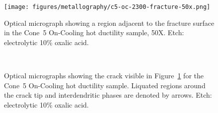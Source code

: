 {%


\begin{figure}
    \centering
    \texttt{[image: figures/metallography/c5-oc-2300-fracture-50x.png]}
    \caption{Optical micrograph showing a region adjacent to the fracture surface in the Cone~5 On-Cooling \protect{} hot ductility sample, 50X. Etch: electrolytic 10\% oxalic acid.}
    \label{fig:c5-oc-2300-fracture-50x}
\end{figure}

\begin{figure}
    \centering
     \\
    \caption[Optical micrographs showing the crack visible in Figure~\ref{fig:c5-oc-2300-fracture-50x} for the Cone~5 On-Cooling \protect{} hot ductility sample.]{Optical micrographs showing the crack visible in Figure~\ref{fig:c5-oc-2300-fracture-50x} for the Cone~5 On-Cooling \protect{} hot ductility sample. Liquated regions around the crack tip and interdendritic phases are denoted by arrows. Etch: electrolytic 10\% oxalic acid.}
    \label{fig:c5-oc-2300-crack-olm}
\end{figure}

}
